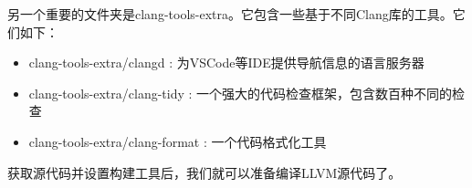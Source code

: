 另一个重要的文件夹是clang-tools-extra。它包含一些基于不同Clang库的工具。它们如下：


\begin{itemize}
\item
clang-tools-extra/clangd : 为VSCode等IDE提供导航信息的语言服务器

\item
clang-tools-extra/clang-tidy : 一个强大的代码检查框架，包含数百种不同的检查

\item
clang-tools-extra/clang-format :  一个代码格式化工具
\end{itemize}

获取源代码并设置构建工具后，我们就可以准备编译LLVM源代码了。























